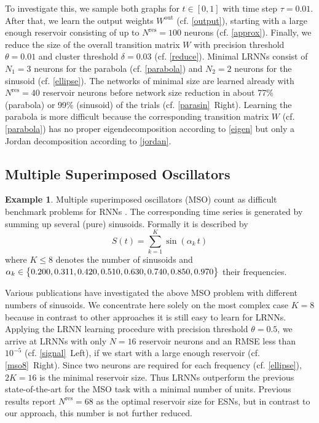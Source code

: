 \documentclass{sn-jnl}
\theoremstyle{definition}
\newtheorem{exmp}{Example}
\begin{document}
To investigate this, we sample both graphs for $t \in [0,1]$ with time step
$\tau=0.01$. After that, we learn the output weights $W^\mathrm{out}$ (cf.
\cref{output}), starting with a large enough reservoir consisting of up to
$N^\mathrm{res} = 100$ neurons (cf. \cref{approx}). Finally, we reduce the
size of the overall transition matrix $W$ with precision threshold $\theta =
0.01$ and cluster threshold $\delta = 0.03$ (cf. \cref{reduce}). Minimal LRNNs
consist of $N_1 = 3$ neurons for
the parabola (cf. \cref{parabola}) and $N_2 = 2$ neurons for the sinusoid
(cf. \cref{ellipse}). The networks of minimal size are learned already with
$N^\mathrm{res} = 40$ reservoir neurons before network size reduction in about
77\% (parabola) or 99\% (sinusoid) of the trials (cf. \cref{parasin}~Right).
Learning the parabola is more difficult because the corresponding transition
matrix $W$ (cf. \cref{parabola}) has no proper eigendecomposition according
to \cref{eigen} but only a Jordan decomposition according to \cref{jordan}.

\subsection{Multiple Superimposed Oscillators}\label{mso}

\begin{exmp}\label{exmp}
Multiple superimposed oscillators (MSO) count as difficult benchmark problems
for RNNs \citep{KLB12,SW+07}. The corresponding time
series is generated by summing up several (pure) sinusoids. Formally
it is described by
	\[ S(t) = \sum\limits_{k=1}^K \sin(\alpha_k\,t) \]
where $K \le 8$ denotes the number of sinusoids and $\alpha_k \in \big\{ 0.200,
0.311, 0.420, 0.510, 0.630,\linebreak 0.740, 0.850, 0.970 \big\}$ their frequencies.
\end{exmp}

Various publications have investigated the above MSO problem with different numbers of
sinusoids. We concentrate here solely on the most complex case $K=8$
because in contrast to other approaches it is still easy to learn for LRNNs.
Applying the LRNN learning procedure with precision threshold $\theta = 0.5$,
we arrive at LRNNs with only $N=16$ reservoir neurons and an RMSE less than
$10^{-5}$ (cf. \cref{signal}~Left), if we start with a large enough reservoir (cf.
\cref{mso8}~Right). Since two neurons are required for each frequency (cf.
\cref{ellipse}), $2K=16$ is the minimal reservoir size. Thus LRNNs outperform
the previous state-of-the-art for the
MSO task with a minimal number of units. Previous results \citep{KLB12} report $N^\mathrm{res} =
68$ as the optimal reservoir size for ESNs, but in contrast to our approach,
this number is not further reduced.
\end{document}
